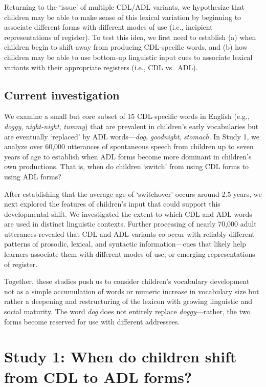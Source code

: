 \documentclass[10pt, letterpaper]{article}
\begin{document}
Returning to the `issue' of multiple CDL/ADL variants, we hypothesize
that children may be able to make sense of this lexical variation by
beginning to associate different forms with different modes of use
(i.e., incipient representations of register). To test this idea, we
first need to establish (a) when children begin to shift away from
producing CDL-specific words, and (b) how children may be able to use
bottom-up linguistic input cues to associate lexical variants with their
appropriate registers (i.e., CDL vs.~ADL).

\hypertarget{current-investigation}{%
\subsection{Current investigation}\label{current-investigation}}

We examine a small but core subset of 15 CDL-specific words in English
(e.g., \emph{doggy}, \emph{night-night}, \emph{tummy}) that are
prevalent in children's early vocabularies but are eventually `replaced'
by ADL words---\emph{dog}, \emph{goodnight}, \emph{stomach}. In Study 1,
we analyze over 60,000 utterances of spontaneous speech from children up
to seven years of age to establish when ADL forms become more dominant
in children's own productions. That is, when do children `switch' from
using CDL forms to using ADL forms?

After establishing that the average age of `switchover' occurs around
2.5 years, we next explored the features of children's input that could
support this developmental shift. We investigated the extent to which
CDL and ADL words are used in distinct linguistic contexts. Further
processing of nearly 70,000 adult utterances revealed that CDL and ADL
variants co-occur with reliably different patterns of prosodic, lexical,
and syntactic information---cues that likely help learners associate
them with different modes of use, or emerging representations of
register.

Together, these studies push us to consider children's vocabulary
development not as a simple accumulation of words or numeric increase in
vocabulary size but rather a deepening and restructuring of the lexicon
with growing linguistic and social maturity. The word \emph{dog} does
not entirely replace \emph{doggy}---rather, the two forms become
reserved for use with different addressees.

\hypertarget{study-1-when-do-children-shift-from-cdl-to-adl-forms}{%
\section{Study 1: When do children shift from CDL to ADL
forms?}\label{study-1-when-do-children-shift-from-cdl-to-adl-forms}}
\end{document}
